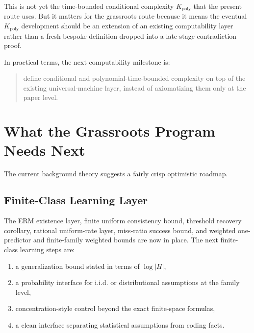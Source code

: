 \documentclass[11pt]{article}
\theoremstyle{remark}
\begin{document}
This is not yet the time-bounded conditional complexity \(K_{\mathrm{poly}}\)
that the present route uses.  But it matters for the grassroots route because it
means the eventual \(K_{\mathrm{poly}}\) development should be an extension of an
existing computability layer rather than a fresh bespoke definition dropped into a
late-stage contradiction proof.

In practical terms, the next computability milestone is:

\begin{quote}
define conditional and polynomial-time-bounded complexity on top of the existing
universal-machine layer, instead of axiomatizing them only at the paper level.
\end{quote}

\section{What the Grassroots Program Needs Next}

The current background theory suggests a fairly crisp optimistic roadmap.

\subsection{Finite-Class Learning Layer}

The ERM existence layer, finite uniform consistency bound, threshold recovery
corollary, rational uniform-rate layer, miss-ratio success bound, and weighted
one-predictor and finite-family weighted bounds are now in place.  The next
finite-class learning
steps are:
\begin{enumerate}[leftmargin=1.5em]
  \item a generalization bound stated in terms of \(\log |H|\),
  \item a probability interface for i.i.d. or distributional assumptions at the family level,
  \item concentration-style control beyond the exact finite-space formulas,
  \item a clean interface separating statistical assumptions from coding facts.
\end{enumerate}
\end{document}
